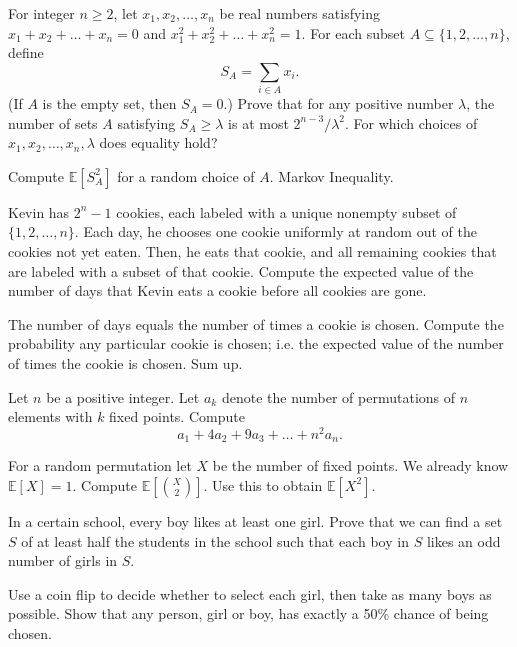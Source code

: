 \documentclass[11pt]{scrartcl}
\newcommand\EE{\mathbb E}
\begin{document}
\begin{problem}
  [USAMO 2012/6] For integer $n\geq2$, let $x_1, x_2, \ldots, x_n$ be real numbers satisfying $x_1+x_2+\ldots+x_n=0$  and $x_1^2+x_2^2+\ldots+x_n^2=1$. For each subset $A\subseteq\{1, 2, \ldots, n\}$, define\[S_A=\sum_{i\in A}x_i.\](If $A$ is the empty set, then $S_A=0$.) Prove that for any positive number $\lambda$, the number of sets $A$ satisfying $S_A\geq\lambda$ is at most $2^{n-3}/\lambda^2$.  For which choices of $x_1, x_2, \ldots, x_n, \lambda$ does equality hold?
  \begin{sketch}
    Compute $\EE[S_A^2]$ for a random choice of $A$.
    Markov Inequality.
  \end{sketch}
\end{problem}


\begin{problem}
   Kevin has $2^n-1$ cookies, each labeled with a unique nonempty subset of $\{1,2,\dots,n\}$.
  Each day, he chooses one cookie uniformly at random out of the cookies not yet eaten.
  Then, he eats that cookie, and all remaining cookies that are labeled with a subset of that cookie.
  Compute the expected value of the number of days that Kevin eats a cookie before all cookies are gone. %
  \begin{sketch}
    The number of days equals the number of times a cookie is chosen.
    Compute the probability any particular cookie is chosen;
    {i.e.} the expected value of the number of times the cookie is chosen.
    Sum up.
  \end{sketch}
\end{problem}

\begin{problem}
  Let $n$ be a positive integer.
  Let $a_k$ denote the number of permutations of $n$ elements with $k$ fixed points.
  Compute \[ a_1 + 4a_2 + 9a_3 + \dots + n^2a_n. \]
  \begin{sketch}
    For a random permutation let $X$ be the number of fixed points.
    We already know $\EE[X] = 1$.
    Compute $\EE[\binom{X}{2}]$.
    Use this to obtain $\EE[X^2]$.
  \end{sketch}
\end{problem}

\begin{problem}
  [Russia 1999] In a certain school, every boy likes at least one girl.
  Prove that we can find a set $S$ of at least half the students in the school
  such that each boy in $S$ likes an odd number of girls in $S$.
  \begin{sketch}
    Use a coin flip to decide whether to select each girl, then take as many boys as possible.
    Show that any person, girl or boy, has exactly a 50\% chance of being chosen.
  \end{sketch}
\end{problem}
\end{document}
